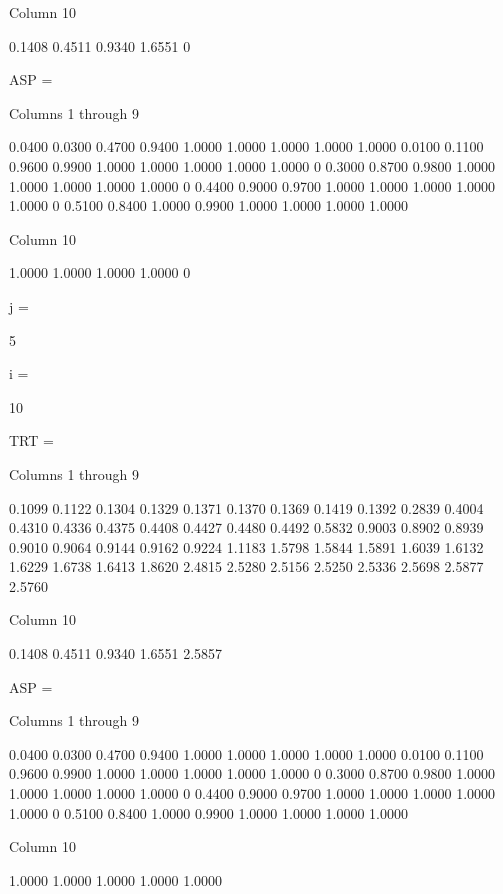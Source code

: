   Column 10

    0.1408
    0.4511
    0.9340
    1.6551
         0


ASP =

  Columns 1 through 9

    0.0400    0.0300    0.4700    0.9400    1.0000    1.0000    1.0000    1.0000    1.0000
    0.0100    0.1100    0.9600    0.9900    1.0000    1.0000    1.0000    1.0000    1.0000
         0    0.3000    0.8700    0.9800    1.0000    1.0000    1.0000    1.0000    1.0000
         0    0.4400    0.9000    0.9700    1.0000    1.0000    1.0000    1.0000    1.0000
         0    0.5100    0.8400    1.0000    0.9900    1.0000    1.0000    1.0000    1.0000

  Column 10

    1.0000
    1.0000
    1.0000
    1.0000
         0


j =

     5


i =

    10


TRT =

  Columns 1 through 9

    0.1099    0.1122    0.1304    0.1329    0.1371    0.1370    0.1369    0.1419    0.1392
    0.2839    0.4004    0.4310    0.4336    0.4375    0.4408    0.4427    0.4480    0.4492
    0.5832    0.9003    0.8902    0.8939    0.9010    0.9064    0.9144    0.9162    0.9224
    1.1183    1.5798    1.5844    1.5891    1.6039    1.6132    1.6229    1.6738    1.6413
    1.8620    2.4815    2.5280    2.5156    2.5250    2.5336    2.5698    2.5877    2.5760

  Column 10

    0.1408
    0.4511
    0.9340
    1.6551
    2.5857


ASP =

  Columns 1 through 9

    0.0400    0.0300    0.4700    0.9400    1.0000    1.0000    1.0000    1.0000    1.0000
    0.0100    0.1100    0.9600    0.9900    1.0000    1.0000    1.0000    1.0000    1.0000
         0    0.3000    0.8700    0.9800    1.0000    1.0000    1.0000    1.0000    1.0000
         0    0.4400    0.9000    0.9700    1.0000    1.0000    1.0000    1.0000    1.0000
         0    0.5100    0.8400    1.0000    0.9900    1.0000    1.0000    1.0000    1.0000

  Column 10

    1.0000
    1.0000
    1.0000
    1.0000
    1.0000


